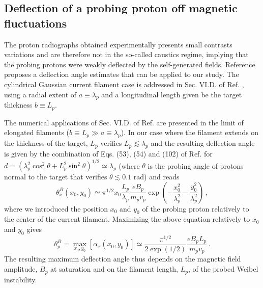 \documentclass[aps,showpacs,superscriptaddress]{revtex4}
\begin{document}
\subsection{Deflection of a probing proton off magnetic fluctuations}
The proton radiographs obtained experimentally presents small contrasts variations and are therefore not in the so-called caustics regime, implying that the probing protons were weakly deflected by the self-generated fields.
Reference \cite[]{RSI_protograhyb} proposes a  deflection angle estimates that can be applied to our study.
The  cylindrical Gaussian current filament case is addressed in Sec. VI.D. of Ref.  \cite[]{RSI_protograhyb}, using a radial extent of $a\equiv\lambda_p$ and a longitudinal length given be the target thickness $b\equiv L_p$.

The numerical applications of  Sec. VI.D. of Ref.  \cite[]{RSI_protograhyb} are presented in the limit of   elongated filaments ($b\equiv L_p\gg a\equiv\lambda_p $). In our case where the filament  extends on the thickness of the target, $L_p$  verifies $ L_p \lesssim \lambda_p$ and the resulting deflection angle is given by the combination of Eqs. (53), (54) and (102) of Ref.  \cite[]{RSI_protograhyb} for $d = ( \lambda_p^2\cos^2\theta + L_p^2 \sin^2 \theta)^{1/2} \simeq  \lambda_p$ (where $\theta$ is the probing angle of protons normal to the target that verifies $\theta\lesssim 0.1$ rad) and reads
\begin{equation}\label{eq:alphaphith}
\theta^B_x(x_0,y_0) \simeq \pi^{1/2} x_0 \frac{L_p }{\lambda_p}  \frac{e B_p }{m_p v_p} \exp\left(-\frac{x_0^2}{\lambda_p^2}-\frac{y_0^2}{ \lambda_p^2} \right)\, ,
\end{equation}
where we introduced the position $x_0$ and $y_0$ of the probing proton relatively to the center of the current filament.
Maximizing the above equation relatively to $x_0$ and $y_0$ gives
\begin{equation}
\theta^B_p = \max_{x_0,y_0}[\alpha_x(x_0,y_0) ] \simeq \frac{\pi^{1/2}}{2\exp(1/2)} \frac{e  B_p L_p }{m_p v_p}\, . \label{eq:alaphaphi}
\end{equation}
The resulting maximum deflection angle thus depends on the magnetic field amplitude,  $  B_p$ at saturation and on the filament length, $L_p$, of the probed Weibel instability.
\end{document}
